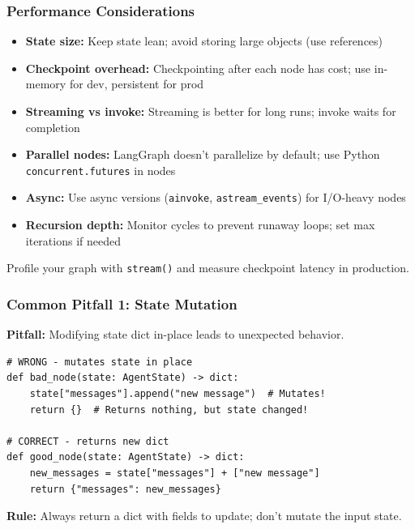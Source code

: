 \documentclass[aspectratio=169,11pt]{beamer}
\begin{document}
\begin{frame}
\frametitle{Performance Considerations}
\begin{itemize}
    \setlength{\itemsep}{1pt}
  \item \textbf{State size:} Keep state lean; avoid storing large objects (use references)
  \item \textbf{Checkpoint overhead:} Checkpointing after each node has cost; use in-memory for dev, persistent for prod
  \item \textbf{Streaming vs invoke:} Streaming is better for long runs; invoke waits for completion
  \item \textbf{Parallel nodes:} LangGraph doesn't parallelize by default; use Python \texttt{concurrent.futures} in nodes
  \item \textbf{Async:} Use async versions (\texttt{ainvoke}, \texttt{astream\_events}) for I/O-heavy nodes
  \item \textbf{Recursion depth:} Monitor cycles to prevent runaway loops; set max iterations if needed
\end{itemize}

\vspace{15pt}
\begin{tipbox}[Optimization]
Profile your graph with \texttt{stream()} and measure checkpoint latency in production.
\end{tipbox}
\end{frame}

\begin{frame}[fragile]
\frametitle{Common Pitfall 1: State Mutation}
\textbf{Pitfall:} Modifying state dict in-place leads to unexpected behavior.

\vspace{10pt}
\begin{lstlisting}
# WRONG - mutates state in place
def bad_node(state: AgentState) -> dict:
    state["messages"].append("new message")  # Mutates!
    return {}  # Returns nothing, but state changed!

# CORRECT - returns new dict
def good_node(state: AgentState) -> dict:
    new_messages = state["messages"] + ["new message"]
    return {"messages": new_messages}
\end{lstlisting}

\vspace{10pt}
\textbf{Rule:} Always return a dict with fields to update; don't mutate the input state.
\end{frame}
\end{document}
